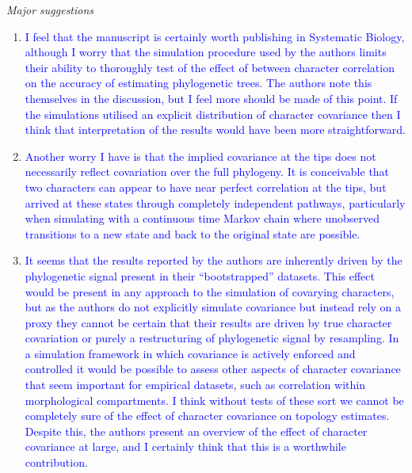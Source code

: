 \documentclass[12pt,letterpaper]{article}
\renewcommand{\subsection}[1]{%
\bigskip
\begin{center}
\begin{large}
\normalfont\itshape #1
\end{large}
\end{center}}
\begin{document}
\subsection{Major suggestions}

\begin{enumerate}

\item{\textcolor{blue}{I feel that the manuscript is certainly worth publishing in Systematic Biology, although I worry that the simulation procedure used by the authors limits their ability to thoroughly test of the effect of between character correlation on the accuracy of estimating phylogenetic trees. The authors note this themselves in the discussion, but I feel more should be made of this point. If the simulations utilised an explicit distribution of character covariance then I think that interpretation of the results would have been more straightforward.}}


\item{\textcolor{blue}{Another worry I have is that the implied covariance at the tips does not necessarily reflect covariation over the full phylogeny. It is conceivable that two characters can appear to have near perfect correlation at the tips, but arrived at these states through completely independent pathways, particularly when simulating with a continuous time Markov chain where unobserved transitions to a new state and back to the original state are possible.}}


\item{\textcolor{blue}{It seems that the results reported by the authors are inherently driven by the phylogenetic signal present in their ``bootstrapped'' datasets. This effect would be present in any approach to the simulation of covarying characters, but as the authors do not explicitly simulate covariance but instead rely on a proxy they cannot be certain that their results are driven by true character covariation or purely a restructuring of phylogenetic signal by resampling. In a simulation framework in which covariance is actively enforced and controlled it would be possible to assess other aspects of character covariance that seem important for empirical datasets, such as correlation within morphological compartments. I think without tests of these sort we cannot be completely sure of the effect of character covariance on topology estimates. Despite this, the authors present an overview of the effect of character covariance at large, and I certainly think that this is a worthwhile contribution.}}


\end{enumerate}
\end{document}
